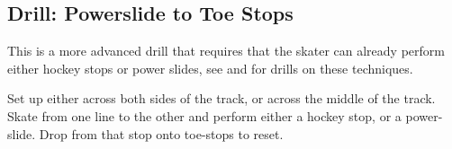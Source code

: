 \subsection*{Drill: Powerslide to Toe Stops} 
\label{drill:footwork/slide_to_toe_stop}

This is a more advanced drill that requires that the skater can already perform either hockey stops or power slides, see  and  for drills on these techniques. 

Set up either across both sides of the track, or across the middle of the track. 
Skate from one line to the other and perform either a hockey stop, or a power-slide.
Drop from that stop onto toe-stops to reset.


